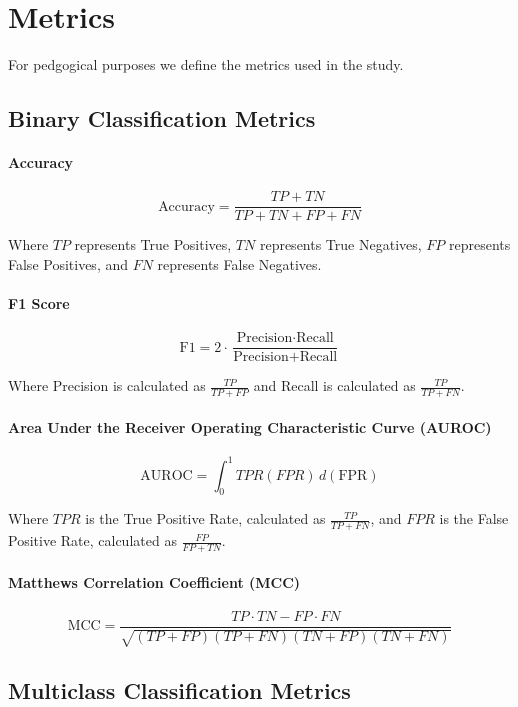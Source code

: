 \documentclass{article}
\theoremstyle{plain}
\theoremstyle{definition}
\theoremstyle{remark}
\begin{document}
\newpage
\section{Metrics}

For pedgogical purposes we define the metrics used in the study.
\label{metricss}

\subsection{Binary Classification Metrics}

\paragraph{Accuracy}
   $$ \text{Accuracy} = \frac{TP + TN}{TP + TN + FP + FN} $$
   
Where \( TP \) represents True Positives, \( TN \) represents True Negatives, \( FP \) represents False Positives, and \( FN \) represents False Negatives.

\paragraph{F1 Score}
   $$ \text{F1} = 2 \cdot \frac{\text{Precision} \cdot \text{Recall}}{\text{Precision} + \text{Recall}} $$
   
Where Precision is calculated as \( \frac{TP}{TP + FP} \) and Recall is calculated as \( \frac{TP}{TP + FN} \).

\paragraph{Area Under the Receiver Operating Characteristic Curve (AUROC)}
   $$ \text{AUROC} = \int_{0}^{1} TPR(FPR) \, d(\text{FPR}) $$
   
Where \( TPR \) is the True Positive Rate, calculated as \( \frac{TP}{TP + FN} \), and \( FPR \) is the False Positive Rate, calculated as \( \frac{FP}{FP + TN} \).

\paragraph{Matthews Correlation Coefficient (MCC)}
   $$ \text{MCC} = \frac{TP \cdot TN - FP \cdot FN}{\sqrt{(TP + FP)(TP + FN)(TN + FP)(TN + FN)}} $$

\subsection{Multiclass Classification Metrics}
\end{document}
